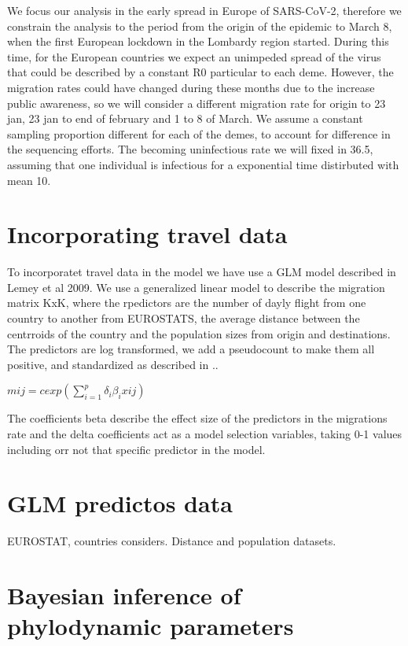 We focus our analysis in the early spread in Europe of SARS-CoV-2, therefore we constrain the analysis to the period from the origin of the epidemic to March 8, when the first European lockdown in the Lombardy region started. During this time, for the European countries we expect an unimpeded spread of the virus that could be described by a constant R0 particular to each deme. However, the migration rates could have changed during these months due to the increase public awareness, so we will consider a different migration rate for origin to 23 jan, 23 jan to end of february and 1 to 8 of March. We assume a constant sampling proportion different for each of the demes, to account for difference in the sequencing efforts. The becoming uninfectious rate we will fixed in 36.5, assuming that one individual is infectious for a exponential time distirbuted with mean 10.


\section{Incorporating travel data}

To incorporatet travel data in the model we have use a GLM model described in Lemey et al 2009. We use a generalized linear model to describe the migration matrix KxK, where the rpedictors are the number of dayly flight from one country to another from EUROSTATS, the average distance between the centrroids of the country and the population sizes from origin and destinations. The predictors are log transformed, we add a pseudocount to make them all positive, and standardized as described in ..

$mij = c exp(\sum_{i = 1}^p \delta_i \beta_i xij)$

The coefficients beta describe the effect size of the predictors in the migrations rate and the delta coefficients act as a model selection variables, taking 0-1 values including orr not that specific predictor in the model.


\section{GLM predictos data}

EUROSTAT, countries considers. Distance and population datasets.


\section{Bayesian inference of phylodynamic parameters}

